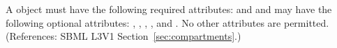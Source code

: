 A \Compartment object must have the following required attributes: 
 and 
and may have the following optional attributes:
, , , ,
 and .  No other attributes are permitted.  
(References: SBML L3V1 Section~\ref{sec:compartments}.)
